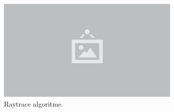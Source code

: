 \begin{figure}
  \centering
  \includegraphics[width=0.8\textwidth]{./img/raw/placeholder.png}
  \caption{Raytrace algoritme.}
  \label{fig:rt-raytracing}
\end{figure}
